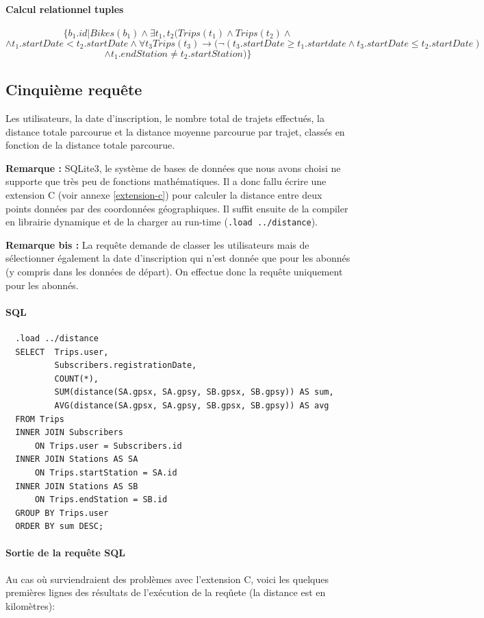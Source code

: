 \documentclass[a4paper]{article}
\begin{document}
    \paragraph{Calcul relationnel tuples}
    $$ \{ b_1.id | Bikes(b_1) \land \exists t_1, t_2 (Trips(t_1) \land Trips(t_2) \land $$
    $$ \land t_1.startDate < t_2.startDate \land \forall t_3 Trips(t_3) \rightarrow (\lnot (t_3.startDate \geq t_1.startdate \land t_3.startDate \leq t_2.startDate)$$
    $$ \land t_1.endStation \neq t_2.startStation)\}$$

\subsection{Cinquième requête}
    Les utilisateurs, la date d'inscription, le nombre total de trajets effectués, la distance totale parcourue et la distance moyenne parcourue par trajet, classés en fonction de la distance totale parcourue.
    
    \textbf{Remarque :} SQLite3, le système de bases de données que nous avons choisi ne supporte que très peu de fonctions mathématiques. Il a donc fallu écrire une extension C (voir annexe \ref{extension-c}) pour calculer la distance entre deux points données par des coordonnées géographiques. Il suffit ensuite de la compiler en librairie dynamique et de la charger au run-time (\texttt{.load ../distance}).
    
    \textbf{Remarque bis :} La requête demande de classer les utilisateurs mais de sélectionner également la date d'inscription qui n'est donnée que pour les abonnés (y compris dans les données de départ). On effectue donc la requête uniquement pour les abonnés.

    \paragraph{SQL}
  \begin{verbatim}
  .load ../distance
  SELECT  Trips.user, 
          Subscribers.registrationDate, 
          COUNT(*), 
          SUM(distance(SA.gpsx, SA.gpsy, SB.gpsx, SB.gpsy)) AS sum,
          AVG(distance(SA.gpsx, SA.gpsy, SB.gpsx, SB.gpsy)) AS avg
  FROM Trips
  INNER JOIN Subscribers
      ON Trips.user = Subscribers.id
  INNER JOIN Stations AS SA
      ON Trips.startStation = SA.id
  INNER JOIN Stations AS SB
      ON Trips.endStation = SB.id
  GROUP BY Trips.user
  ORDER BY sum DESC;
  \end{verbatim}
  
  \paragraph{Sortie de la requête SQL} Au cas où surviendraient des problèmes avec l'extension C, voici les quelques premières lignes des résultats de l'exécution de la reqûete (la distance est en kilomètres):
    
\end{document}
